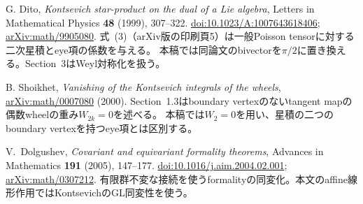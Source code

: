 G. Dito,
\emph{Kontsevich star-product on the dual of a Lie algebra},
Letters in Mathematical Physics \textbf{48} (1999), 307--322.
\href{https://doi.org/10.1023/A:1007643618406}{doi:10.1023/A:1007643618406};
\href{https://arxiv.org/abs/math/9905080}{arXiv:math/9905080}.
式~(3)（arXiv版の印刷頁5）は一般Poisson tensorに対する二次星積とeye項の係数を与える。
本稿では同論文のbivectorを$\pi/2$に置き換える。Section~3はWeyl対称化を扱う。

B. Shoikhet,
\emph{Vanishing of the Kontsevich integrals of the wheels},
\href{https://arxiv.org/abs/math/0007080}{arXiv:math/0007080} (2000).
Section~1.3はboundary vertexのないtangent mapの偶数wheelの重み$W_{2k}=0$を述べる。
本稿では$W_2=0$を用い、星積の二つのboundary vertexを持つeye項とは区別する。

V.~Dolgushev,
\emph{Covariant and equivariant formality theorems},
Advances in Mathematics \textbf{191} (2005), 147--177.
\href{https://doi.org/10.1016/j.aim.2004.02.001}{doi:10.1016/j.aim.2004.02.001};
\href{https://arxiv.org/abs/math/0307212}{arXiv:math/0307212}.
有限群不変な接続を使うformalityの同変化。本文のaffine線形作用ではKontsevichのGL同変性を使う。
